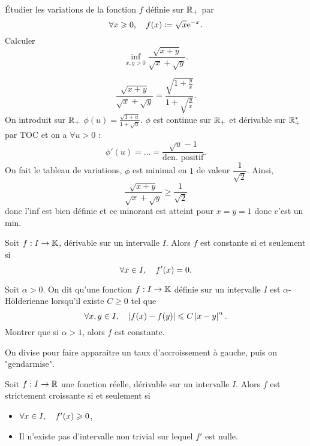 \documentclass{magnoliaold}
\begin{document}
\begin{exos}
\exo Étudier les variations de la fonction $f$ définie sur $\mathbb{R}_+$ par
  \[\forall x\geqslant 0 ,\quad f(x)\coloneqq\sqrt{x}{\rm e}^{-x}.\]
\exo Calculer
  \[\inf_{x,y>0} \frac{\sqrt{x+y}}{\sqrt{x}+\sqrt{y}}.\]
  \begin{sol}
  $$\frac{\sqrt{x+y}}{\sqrt{x}+\sqrt{y}}=\frac{\sqrt{1+\frac{y}{x}}}{1+\sqrt{\frac{y}{x}}}.$$
On introduit sur $\mathbb{R}_+$ $\phi(u)=\frac{\sqrt{1+u}}{1+\sqrt{u}}$. $\phi$ est continue sur $\mathbb{R}_+$ et dérivable sur $\mathbb{R}_+^*$ par TOC et on a $\forall u>0$ :
$$\phi'(u)=\ldots=\frac{\sqrt{u}-1}{\text{den. positif}}.$$
On fait le tableau de variations, $\phi$ est minimal en $1$ de valeur $\dfrac{1}{\sqrt{2}}$. Ainsi, $$\frac{\sqrt{x+y}}{\sqrt{x}+\sqrt{y}}\geq \dfrac{1}{\sqrt{2}}$$ donc l'inf est bien définie et ce minorant est atteint pour $x=y=1$ donc c'est un min. 
  \end{sol}
\end{exos}

\begin{proposition}
  Soit $f:I\to\mathbb{K}$, dérivable sur un intervalle $I$. Alors $f$ est constante si et seulement si
    \[\forall x\in I ,\quad f'(x)=0.\]
\end{proposition}

\begin{exoUnique}
  \exo Soit $\alpha>0$. On dit qu'une fonction $f:I\to\mathbb{K}$ définie sur un intervalle
  $I$ est $\alpha$-Hölderienne lorsqu'il existe $C\geq 0$ tel que
  \[\forall x,y\in I ,\quad \left|f(x)-f(y)\right|\leqslant C\left|x-y\right|^\alpha.\]
  Montrer que si $\alpha>1$, alors $f$ est constante.
  \begin{sol}
  On divise pour faire apparaitre un taux d'accroissement à gauche, puis on "gendarmise".
  \end{sol}
\end{exoUnique}

\begin{proposition}[utile=-3]
Soit $f:I\to\mathbb{R}$ une fonction réelle, dérivable sur un intervalle $I$. Alors $f$ est
strictement croissante si et seulement si
\begin{itemize}
\item $\forall x\in I ,\quad f'(x)\geqslant 0$,
\item Il n'existe pas d'intervalle non trivial sur lequel $f'$ est nulle.
\end{itemize}
\end{proposition}
\end{document}
